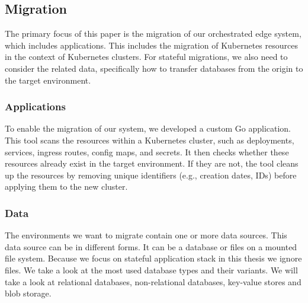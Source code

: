%
\subsection{Migration}
%
The primary focus of this paper is the migration of our orchestrated edge system, which includes applications. This includes the migration of Kubernetes resources in the context of Kubernetes clusters. For stateful migrations, we also need to consider the related data, specifically how to transfer databases from the origin to the target environment.

%
\subsubsection{Applications}
%
To enable the migration of our system, we developed a custom Go application. This tool scans the resources within a Kubernetes cluster, such as deployments, services, ingress routes, config maps, and secrets. It then checks whether these resources already exist in the target environment. If they are not, the tool cleans up the resources by removing unique identifiers (e.g., creation dates, IDs) before applying them to the new cluster.

%
\subsubsection{Data}
%
The environments we want to migrate contain one or more data sources. This data source can be in different forms. It can be a database or files on a mounted file system. Because we focus on stateful application stack in this thesis we ignore files. We take a look at the most used database types and their variants. We will take a look at relational databases, non-relational databases, key-value stores and blob storage. 